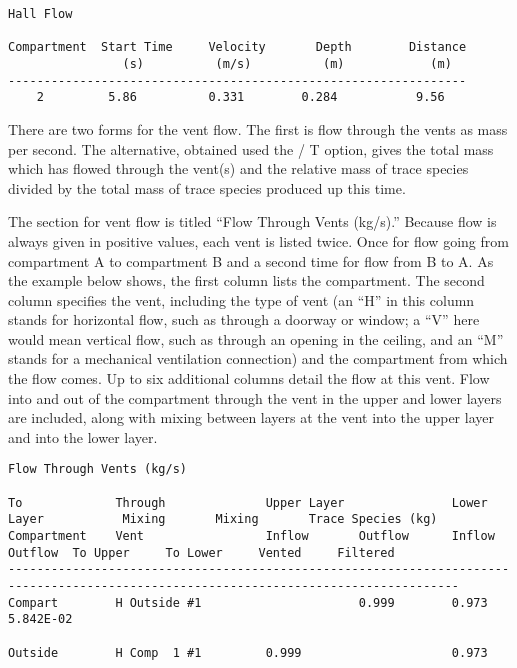\begin{lstlisting}[basicstyle=\tiny]
Hall Flow

Compartment  Start Time     Velocity       Depth        Distance
                (s)          (m/s)          (m)            (m)
----------------------------------------------------------------
    2         5.86          0.331        0.284           9.56
 \end{lstlisting}
 
 There are two forms for the vent flow. The first is flow through the vents as mass per second. The alternative, obtained used the / T option, gives the total mass which has flowed through the vent(s) and the relative mass of trace species divided by the total mass of trace species produced up this time. 

The section for vent flow is titled ``Flow Through Vents (kg/s).''  Because flow is always given in positive values, each vent is listed twice.  Once for flow going from compartment A to compartment B and a second time for flow from B to A.  As the example below shows, the first column lists the compartment.  The second column specifies the vent, including the type of vent (an ``H'' in this column stands for horizontal flow, such as through a doorway or window; a ``V'' here would mean vertical flow, such as through an opening in the ceiling, and an ``M'' stands for a mechanical ventilation connection) and the compartment from which the flow comes. Up to six additional columns detail the flow at this vent. Flow into and out of the compartment through the vent in the upper and lower layers are included, along with mixing between layers at the vent into the upper layer and into the lower layer.

\begin{lstlisting}[basicstyle=\tiny]
Flow Through Vents (kg/s)

To             Through              Upper Layer               Lower Layer           Mixing       Mixing       Trace Species (kg)
Compartment    Vent                 Inflow       Outflow      Inflow       Outflow  To Upper     To Lower     Vented     Filtered
-------------------------------------------------------------------------------------------------------------------------------------
Compart        H Outside #1                      0.999        0.973        5.842E-02                                                      

Outside        H Comp  1 #1         0.999                     0.973
\end{lstlisting}

